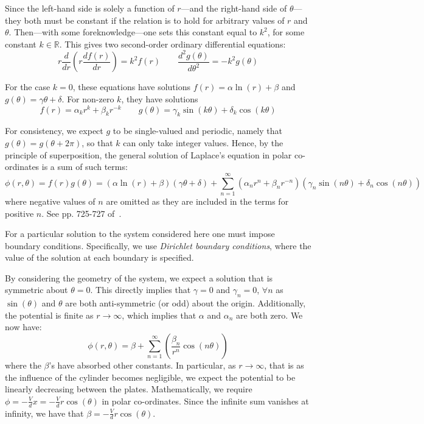 \documentclass[11pt, a4paper]{article}
\newcommand{\be}{\begin{equation}}
\newcommand{\ee}{\end{equation}}
\begin{document}
Since the left-hand side is solely a function of $r$---and the right-hand side of
$\theta$---they both must be constant if the relation is to hold for arbitrary values
of $r$ and $\theta$. Then---with some foreknowledge---one sets this constant equal
to $k^2$, for some constant $k\in\mathbb{R}$. This gives two second-order ordinary
differential equations:
%
\be
r\frac{d}{dr}(r \frac{df(r)}{dr}) = k^2 f(r) \qquad
\frac{d^2 g(\theta)}{d\theta^2}=-k^2 g(\theta)
\ee

For the case $k=0$, these equations have solutions
$f(r)=\alpha \ln(r) + \beta$ and $g(\theta) = \gamma \theta + \delta$.
For non-zero $k$, they have solutions
%
\be
f(r)=\alpha_k r^k + \beta_k r^{-k}
\qquad
g(\theta)= \gamma_k \sin(k\theta)+\delta_k \cos(k\theta)
\ee

For consistency, we expect $g$ to be single-valued and periodic, namely that
$g(\theta)=g(\theta + 2\pi)$, so that $k$ can only take integer values. Hence, by
the principle of superposition, the general solution of Laplace's equation in polar
co-ordinates is a sum of such terms:
%
\be
\phi(r,\theta)
= f(r)g(\theta)
= (\alpha \ln(r) + \beta)(\gamma\theta + \delta) + \sum_{n=1}^{\infty}(\alpha_n r^n+\beta_n r^{-n})(\gamma_n \sin(n\theta) + \delta_n \cos(n\theta))
\ee
%
where negative values of $n$ are omitted as they are included in the terms for positive
$n$. See pp. 725-727 of~\cite{mm}. 

For a particular solution to the system considered here one must impose boundary
conditions. Specifically, we use \emph{Dirichlet boundary conditions}, where the value
of the solution at each boundary is specified.

By considering the geometry of the system, we expect a solution that is symmetric
about $\theta=0$. This directly implies that $\gamma = 0$ and $\gamma_n=0$, $\forall n$
as $\sin(\theta)$ and $\theta$ are both anti-symmetric (or odd) about the origin.
Additionally, the potential is finite as $r \rightarrow \infty$, which implies that
$\alpha$ and $\alpha_n$ are both zero. We now have:
%
\be
\phi(r,\theta)=\beta + \sum_{n=1}^{\infty}(\frac{\beta_n}{r^n} \cos(n\theta))
\ee
%
where the $\beta$'s have absorbed other constants. In particular, as
$r \rightarrow \infty$, that is as the influence of the cylinder becomes negligible,
we expect the potential to be linearly decreasing between the plates. Mathematically,
we require $\phi=-\frac{V}{d}x=-\frac{V}{d}r\cos(\theta)$ in polar co-ordinates.
Since the infinite sum vanishes at infinity, we have that
$\beta=-\frac{V}{d}r\cos(\theta)$.
\end{document}
